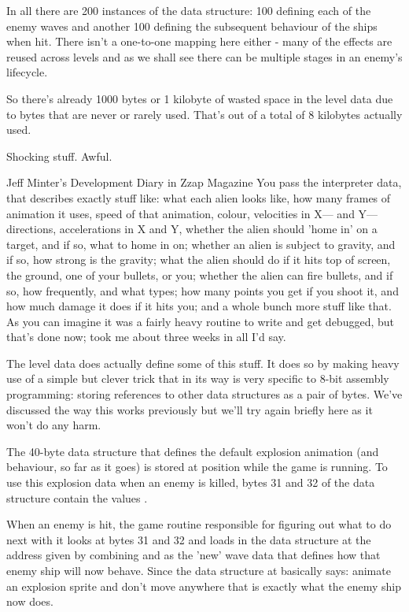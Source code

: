 In all there are 200 instances of the  data structure: 100 defining each of the
enemy waves and another 100 defining the subsequent behaviour of the ships when hit. There isn't
a one-to-one mapping here either - many of the effects are reused across levels and as we shall
see there can be multiple stages in an enemy's lifecycle.

So there's already 1000 bytes or 1 kilobyte of wasted space in the level data due to bytes
that are never or rarely used. That's out of a total of 8 kilobytes actually used.

Shocking stuff. Awful.


\begin{q}{Jeff Minter's Development Diary in Zzap Magazine\cite{planner}}
You pass the interpreter data, that describes exactly stuff like: what each
alien looks like, how many frames of animation it uses, speed of that
animation, colour, velocities in X— and Y— directions, accelerations in X and
Y, whether the alien should 'home in' on a target, and if so, what to home in
on; whether an alien is subject to gravity, and if so, how strong is the
gravity; what the alien should do if it hits top of screen, the ground, one of
your bullets, or you; whether the alien can fire bullets, and if so, how
frequently, and what types; how many points you get if you shoot it, and how
much damage it does if it hits you; and a whole bunch more stuff like that. As
you can imagine it was a fairly heavy routine to write and get debugged, but
that's done now; took me about three weeks in all I'd say.
\end{q}

The level data does actually define some of this stuff. It does so by making
heavy use of a simple but clever trick that in its way is very specific to
8-bit assembly programming: storing references to other data structures as
a pair of bytes. We've discussed the way this works previously but we'll try
again briefly here as it won't do any harm. 

The 40-byte data structure that defines the default explosion animation (and
behaviour, so far as it goes) is stored at position  while the
game is running. To use this explosion data when an enemy is killed, bytes 31
and 32 of the data structure contain the values . 

When an enemy is hit, the game routine responsible for figuring out what to do next
with it looks at bytes 31 and 32 and loads in the data structure at the address
given by combining  and  as the 'new' wave data that
defines how that enemy ship will now behave. Since the data structure at
 basically says: animate an explosion sprite and don't move
anywhere that is exactly what the enemy ship now does.

